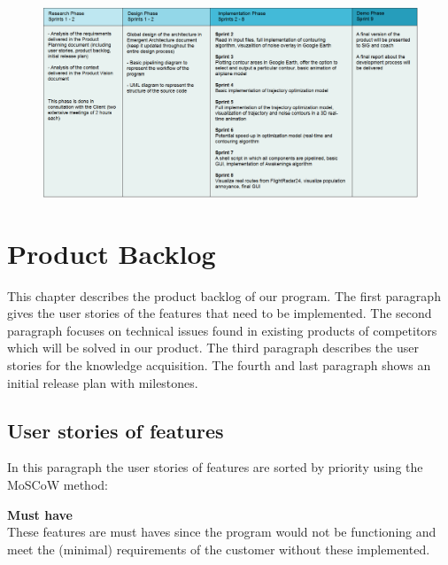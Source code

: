 \documentclass[a4paper,english,fleqn]{exam}
\begin{document}
\begin{figure}[ht]
    \centering
    \includegraphics[width=1.1\textwidth]{roadmap}
\end{figure}

\newpage

\section{Product Backlog}

This chapter describes the product backlog of our program. The first paragraph gives the user stories of the features that need to be implemented. The second paragraph focuses on technical issues found in existing products of competitors which will be solved in our product. The third paragraph describes the user stories for the knowledge acquisition. The fourth and last paragraph shows an initial release plan with milestones. 

\subsection{User stories of features}
In this paragraph the user stories of features are sorted by priority using the MoSCoW method:

\textbf{Must have} \\ 
These features are must haves since the program would not be functioning and meet the (minimal) requirements of the customer without these implemented. 
\end{document}
